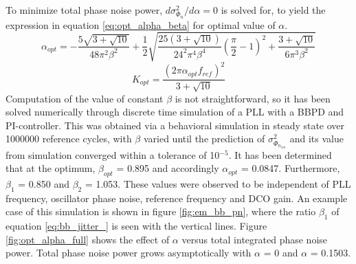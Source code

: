 	To minimize total phase noise power, $d\sigma^2_{\Phi_{n}}/d\alpha = 0$ is solved for, to yield the expression in equation \ref{eq:opt_alpha_beta} for optimal value of $\alpha$.
	\begin{equation} \label{eq:opt_alpha_beta}
		\alpha_{opt} = -\frac{5\sqrt{3+\sqrt{10}}}{48\pi^2\beta^2}
		+ \frac{1}{2}\sqrt{ \frac{25(3+\sqrt{10})}{24^2\pi^4\beta^4}\left(\frac{\pi}{2}-1\right)^2 + \frac{3+\sqrt{10}}{6\pi^3\beta^2}} 
	\end{equation}
	\begin{equation}
		K_{opt} = \frac{(2\pi\alpha_{opt} f_{ref})^2}{3+\sqrt{10}}
	\end{equation}
	Computation of the value of constant $\beta$ is not straightforward, so it has been solved numerically through discrete time simulation of a PLL with a BBPD and PI-controller. This was obtained via a behavioral simulation in steady state over 1000000 reference cycles, with $\beta$ varied until the prediction of $\sigma^2_{\Phi_{n_{em}}}$ and its value from simulation converged within a tolerance of 10$^{-5}$. It has been determined that at the optimum, $\beta_{opt}$ = 0.895 and accordingly $\alpha_{opt}$ = 0.0847. Furthermore, $\beta_1$ = 0.850 and $\beta_2$ = 1.053. These values were observed to be independent of PLL frequency, oscillator phase noise, reference frequency and DCO gain. An example case of this simulation is shown in figure \ref{fig:em_bb_pn}, where the ratio $\beta_1$ of equation \ref{eq:bb_jitter_} is seen with the vertical lines. Figure \ref{fig:opt_alpha_full} shows the effect of $\alpha$ versus total integrated phase noise power. Total phase noise power grows asymptotically with $\alpha$ = 0 and $\alpha$ = 0.1503. 

